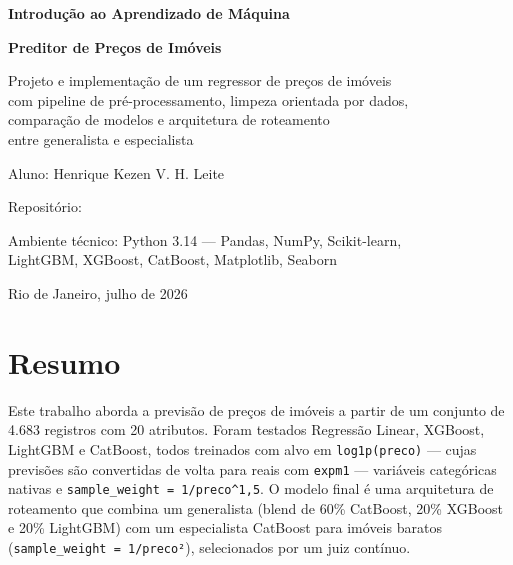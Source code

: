 \documentclass[12pt,a4paper]{article}
\begin{document}
\begin{titlepage}
\centering
\vspace*{3cm}

{\Large\bfseries Introdução ao Aprendizado de Máquina\par}
\vspace{1.5cm}
{\LARGE\bfseries Preditor de Preços de Imóveis\par}
\vspace{1cm}
{\large Projeto e implementação de um regressor de preços de imóveis\\
com pipeline de pré-processamento, limpeza orientada por dados,\\
comparação de modelos e arquitetura de roteamento\\
entre generalista e especialista\par}
\vspace{2cm}
{\large Aluno: Henrique Kezen V. H. Leite\par}
\vspace{0.5cm}
{Repositório:\par}
\vspace{0.5cm}
{Ambiente técnico: Python 3.14 --- Pandas, NumPy, Scikit-learn,\\
LightGBM, XGBoost, CatBoost, Matplotlib, Seaborn\par}
\vfill
{Rio de Janeiro, julho de 2026\par}
\end{titlepage}

\tableofcontents
\newpage

\section*{Resumo}

Este trabalho aborda a previsão de preços de imóveis a partir de um conjunto de 4.683 registros com 20 atributos. Foram testados Regressão Linear, XGBoost, LightGBM e CatBoost, todos treinados com alvo em \lstinline{log1p(preco)} --- cujas previsões são convertidas de volta para reais com \lstinline{expm1} --- variáveis categóricas nativas e \lstinline{sample_weight = 1/preco^1,5}. O modelo final é uma arquitetura de roteamento que combina um generalista (blend de 60\% CatBoost, 20\% XGBoost e 20\% LightGBM) com um especialista CatBoost para imóveis baratos (\lstinline{sample_weight = 1/preco²}), selecionados por um juiz contínuo.
\end{document}
